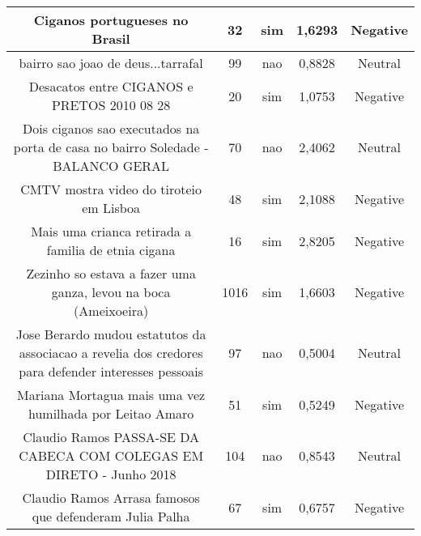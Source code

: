 \documentclass[11pt]{article}
\newlength\mylength
\begin{document}
\begin{center}
\begin{longtable}{||C{.40\mylength}||C{.20\mylength}||C{.20\mylength}||C{.30\mylength}||C{.20\mylength}||}
   Ciganos portugueses no Brasil  & 32 & sim & 1,6293 & Negative \\  \hline
   bairro sao joao de deus...tarrafal  & 99 & nao & 0,8828 & Neutral \\  \hline
   Desacatos entre CIGANOS e PRETOS 2010 08 28  & 20 & sim & 1,0753 & Negative \\  \hline
   Dois ciganos sao executados na porta de casa no bairro Soledade - BALANCO GERAL  & 70 & nao & 2,4062 & Neutral \\  \hline
   CMTV mostra video do tiroteio em Lisboa  & 48 & sim & 2,1088 & Negative \\  \hline
   Mais uma crianca retirada a familia de etnia cigana  & 16 & sim & 2,8205 & Negative \\  \hline
   Zezinho so estava a fazer uma ganza, levou na boca (Ameixoeira)  & 1016 & sim & 1,6603 & Negative \\  \hline
   Jose Berardo mudou estatutos da associacao a revelia dos credores para defender interesses pessoais  & 97 & nao & 0,5004 & Neutral \\  \hline
   Mariana Mortagua mais uma vez humilhada por Leitao Amaro  & 51 & sim & 0,5249 & Negative \\  \hline
   Claudio Ramos PASSA-SE DA CABECA COM COLEGAS EM DIRETO - Junho 2018  & 104 & nao & 0,8543 & Neutral \\  \hline
   Claudio Ramos Arrasa famosos que defenderam Julia Palha  & 67 & sim & 0,6757 & Negative \\  \hline

\end{longtable}
\end{center}
\end{document}
